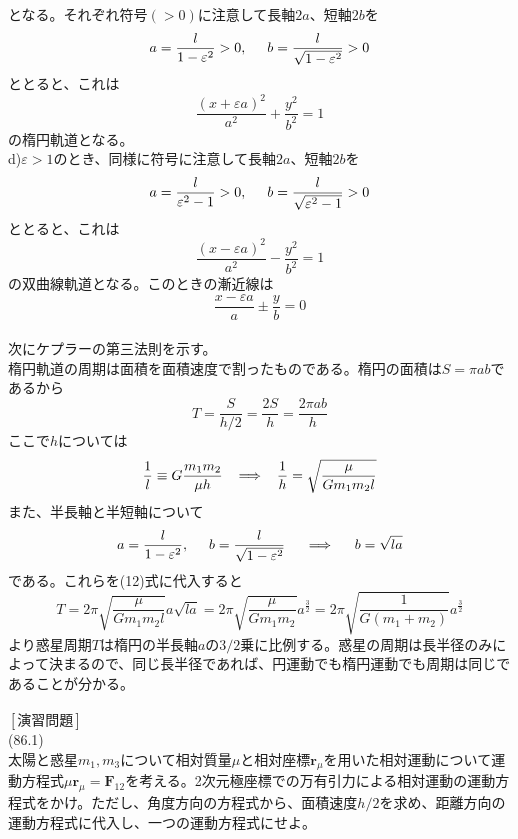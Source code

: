 \documentclass{jsarticle}
\begin{document}
となる。それぞれ符号\((>0)\)に注意して長軸\(2a\)、短軸\(2b\)を
\[a=\frac{l}{1-\varepsilon^{2}}>0,\hspace{5mm}b=\frac{l}{\sqrt{1-\varepsilon^{2}}}>0\]
ととると、これは
\[\frac{(x+\varepsilon a)^{2}}{a^{2}}+\frac{y^{2}}{b^{2}}=1\]
の楕円軌道となる。\\
d)\hspace{3mm}\(\varepsilon>1\)のとき、同様に符号に注意して長軸\(2a\)、短軸\(2b\)を
\[a=\frac{l}{\varepsilon^{2}-1}>0,\hspace{5mm}b=\frac{l}{\sqrt{\varepsilon^{2}-1}}>0\]
ととると、これは
\[\frac{(x-\varepsilon a)^{2}}{a^{2}}-\frac{y^{2}}{b^{2}}=1\]
の双曲線軌道となる。このときの漸近線は
\[\frac{x-\varepsilon a}{a}\pm\frac{y}{b}=0\]
\\
次にケプラーの第三法則を示す。\\
楕円軌道の周期は面積を面積速度で割ったものである。楕円の面積は\(S=\pi ab\)であるから
\begin{equation}
T=\frac{S}{h/2}=\frac{2S}{h}=\frac{2\pi ab}{h}
\end{equation}
ここで\(h\)については
\[\frac{1}{l}\equiv G\frac{m_{1}m_{2}}{\mu h}\hspace{3mm}\Longrightarrow\hspace{3mm}\frac{1}{h}=\sqrt{\frac{\mu}{Gm_{1}m_{2}l}}\]
また、半長軸と半短軸について
\[a=\frac{l}{1-\varepsilon^{2}},\hspace{5mm}b=\frac{l}{\sqrt{1-\varepsilon^{2}}}\hspace{5mm}\Longrightarrow\hspace{5mm}b=\sqrt{la}\]
である。これらを(12)式に代入すると
\begin{equation}
T=2\pi\sqrt{\frac{\mu}{Gm_{1}m_{2}l}}a\sqrt{la}=2\pi\sqrt{\frac{\mu}{Gm_{1}m_{2}}}a^{\frac{3}{2}}=2\pi\sqrt{\frac{1}{G(m_{1}+m_{2})}}a^{\frac{3}{2}}
\end{equation}
より惑星周期\(T\)は楕円の半長軸\(a\)の\(3/2\)乗に比例する。惑星の周期は長半径のみによって決まるので、同じ長半径であれば、円運動でも楕円運動でも周期は同じであることが分かる。\\
\\
\newpage
\noindent
\([演習問題]\)\\
(86.1)\\
太陽と惑星\(m_{1},m_{3}\)について相対質量\(\mu\)と相対座標\(\bm{r}_{\mu}\)を用いた相対運動について運動方程式\(\mu\bm{r}_{\mu}=\bm{F}_{12}\)を考える。2次元極座標での万有引力による相対運動の運動方程式をかけ。ただし、角度方向の方程式から、面積速度\(h/2\)を求め、距離方向の運動方程式に代入し、一つの運動方程式にせよ。\\
\end{document}

